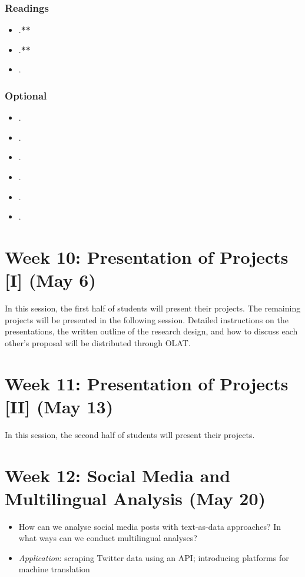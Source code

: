 \documentclass[abstract=on,parskip=full,headings=standardclasses,fontsize=11pt,paper=a4]{scrartcl}
\begin{document}
\subsubsection*{Readings}
\begin{itemize}
\item {}.\textbf{**}
\item {}.\textbf{**}
\item {}.
\end{itemize}


\subsubsection*{Optional}
\begin{itemize}
\item {}.
\item {}.
\item {}.
\item {}.
\item {}.
\item {}.
\end{itemize}

\section{Week 10: Presentation of Projects [I] (May 6)}

In this session, the first half of students will present their projects. The remaining projects will be presented in the following session. Detailed instructions on the presentations, the written outline of the research design, and how to discuss each other's proposal will be distributed through OLAT.


\section{Week 11: Presentation of Projects [II] (May 13)}

In this session, the second half of students will present their projects. 



\section{Week 12: Social Media and Multilingual Analysis (May 20)}

\begin{itemize}
\renewcommand\labelitemi{--}
\item How can we analyse social media posts with text-as-data approaches? In what ways can we conduct multilingual analyses? 
\item \textit{Application}: scraping Twitter data using an API; introducing platforms for machine translation
\end{itemize}
\end{document}
